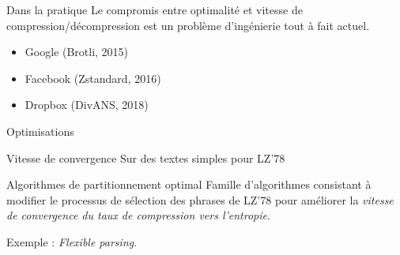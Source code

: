 \begin{frame}

	\begin{block}{Dans la pratique}
		Le compromis entre optimalité et vitesse de compression/décompression 
		est un problème d'ingénierie tout à fait actuel.
		\begin{itemize}
			\item Google (Brotli, 2015)
			\item Facebook (Zstandard, 2016)
			\item Dropbox (DivANS, 2018)
		\end{itemize}
	\end{block}

\end{frame}

	\begin{frame}{Optimisations}

		\begin{block}{Vitesse de convergence}
			Sur des textes simples pour LZ'78
		\end{block} 

		\begin{block}{Algorithmes de partitionnement optimal}
			Famille d'algorithmes consistant 
			à modifier le processus de sélection des phrases de LZ'78 
			pour améliorer la \emph{vitesse de convergence du
			taux de compression vers l'entropie}.

			Exemple : \emph{Flexible parsing}.
		\end{block}
	\end{frame}





